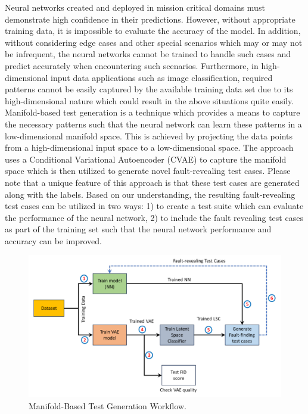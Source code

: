 Neural networks created and deployed in mission critical domains must demonstrate high confidence in their predictions. However, without appropriate training data, it is impossible to evaluate the accuracy of the model. In addition, without considering edge cases and other special scenarios which may or may not be infrequent, the neural networks cannot be trained to handle such cases and predict accurately when encountering such scenarios. Furthermore, in high-dimensional input data applications such as image classification, required patterns cannot be easily captured by the available training data set due to its high-dimensional nature which could result in the above situations quite easily. Manifold-based test generation is a technique which provides a means to capture the necessary patterns such that the neural network can learn these patterns in a low-dimensional manifold space. This is achieved by projecting the data points from a high-dimensional input space to a low-dimensional space. The approach uses a Conditional Variational Autoencoder (CVAE) to capture the manifold space which is then utilized to generate novel fault-revealing test cases. Please note that a unique feature of this approach is that these test cases are generated along with the labels. Based on our understanding, the resulting fault-revealing test cases can be utilized in two ways: 1) to create a test suite which can evaluate the performance of the neural network, 2) to include the fault revealing test cases as part of the training set such that the neural network performance and accuracy can be improved.

\begin{figure}[h]
	\includegraphics[width=\linewidth]{Fig/manifold_workflow.pdf}
	\caption{Manifold-Based Test Generation Workflow.}
	\label{fig:manifold_workflow}
\end{figure}

